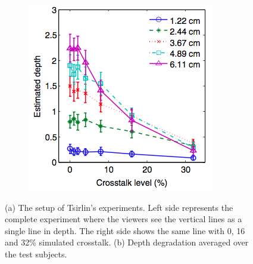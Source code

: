 \begin{figure}[htbp]
\begin{subfigure}[b]{0.5\textwidth}
        \includegraphics[width=\textwidth]{./Template_Figures/tsirlin_res}
        \caption{}\label{fig:tsirlin_res}
    \end{subfigure}
    \caption{(a) The setup of Tsirlin's experiments. Left side represents the complete experiment where the viewers see the vertical lines as a single line in depth. The right side shows the same line with 0, 16 and 32\% simulated crosstalk. (b) Depth degradation averaged over the test subjects.\label{fig:tsirlin}}
\end{figure}
